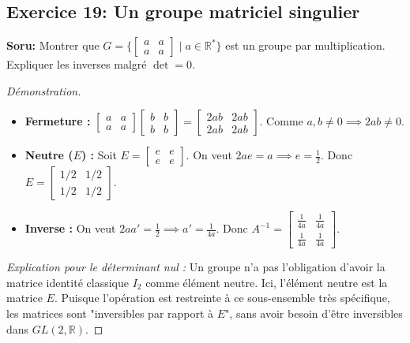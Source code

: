 \documentclass[12pt,a4paper]{report}
\begin{document}
\subsection*{Exercice 19: Un groupe matriciel singulier}
\textbf{Soru:} Montrer que $G = \{ \begin{bmatrix} a & a \\ a & a \end{bmatrix} \mid a \in \mathbb{R}^* \}$ est un groupe par multiplication. Expliquer les inverses malgré $\det = 0$.
\begin{proof}[Démonstration]
\begin{itemize}
    \item \textbf{Fermeture :} $\begin{bmatrix} a & a \\ a & a \end{bmatrix} \begin{bmatrix} b & b \\ b & b \end{bmatrix} = \begin{bmatrix} 2ab & 2ab \\ 2ab & 2ab \end{bmatrix}$. Comme $a, b \neq 0 \implies 2ab \neq 0$.
    \item \textbf{Neutre ($E$) :} Soit $E = \begin{bmatrix} e & e \\ e & e \end{bmatrix}$. On veut $2ae = a \implies e = \frac{1}{2}$. Donc $E = \begin{bmatrix} 1/2 & 1/2 \\ 1/2 & 1/2 \end{bmatrix}$.
    \item \textbf{Inverse :} On veut $2aa' = \frac{1}{2} \implies a' = \frac{1}{4a}$. Donc $A^{-1} = \begin{bmatrix} \frac{1}{4a} & \frac{1}{4a} \\ \frac{1}{4a} & \frac{1}{4a} \end{bmatrix}$.
\end{itemize}
\textit{Explication pour le déterminant nul :} Un groupe n'a pas l'obligation d'avoir la matrice identité classique $I_2$ comme élément neutre. Ici, l'élément neutre est la matrice $E$. Puisque l'opération est restreinte à ce sous-ensemble très spécifique, les matrices sont "inversibles par rapport à $E$", sans avoir besoin d'être inversibles dans $GL(2, \mathbb{R})$.
\end{proof}
\end{document}
